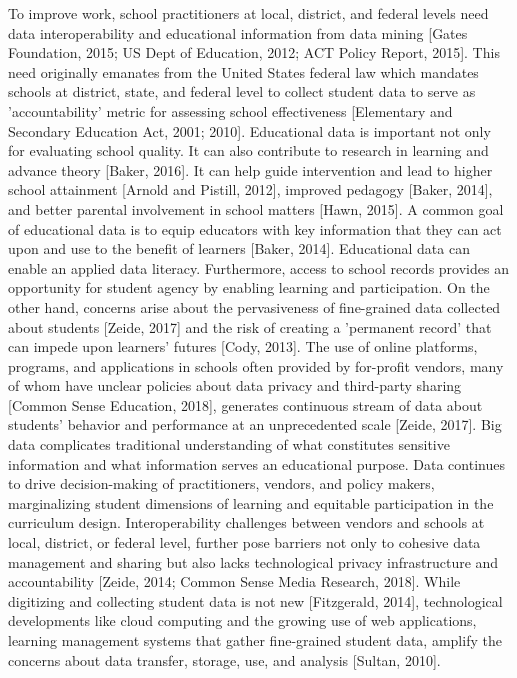 \documentclass{article}
\begin{document}
To improve work, school practitioners at local, district, and federal levels need data interoperability and educational information from data mining [Gates Foundation, 2015; US Dept of Education, 2012; ACT Policy Report, 2015]. This need originally emanates from the United States federal law which mandates schools at district, state, and federal level to collect student data to serve as 'accountability' metric for assessing school effectiveness [Elementary and Secondary Education Act, 2001; 2010].
\bigbreak
Educational data is important not only for evaluating school quality. It can also contribute to research in learning and advance theory [Baker, 2016]. It can help guide intervention and lead to higher school attainment [Arnold and Pistill, 2012], improved pedagogy [Baker, 2014], and better parental involvement in school matters [Hawn, 2015]. A common goal of educational data is to equip educators with key information that they can act upon and use to the benefit of learners [Baker, 2014]. Educational data can enable an applied data literacy. Furthermore, access to school records provides an opportunity for student agency by enabling learning and participation.
\bigbreak
On the other hand, concerns arise about the pervasiveness of fine-grained data collected about students [Zeide, 2017] and the risk of creating a 'permanent record' that can impede upon learners' futures [Cody, 2013]. The use of online platforms, programs, and applications in schools often provided by for-profit vendors, many of whom have unclear policies about data privacy and third-party sharing [Common Sense Education, 2018], generates continuous stream of data about students' behavior and performance at an unprecedented scale [Zeide, 2017]. Big data complicates traditional understanding of what constitutes sensitive information and what information serves an educational purpose. Data continues to drive decision-making of practitioners, vendors, and policy makers, marginalizing student dimensions of learning and equitable participation in the curriculum design.
\bigbreak
Interoperability challenges between vendors and schools at local, district, or federal level, further pose barriers not only to cohesive data management and sharing but also lacks technological privacy infrastructure and accountability [Zeide, 2014; Common Sense Media Research, 2018]. While digitizing and collecting student data is not new [Fitzgerald, 2014], technological developments like cloud computing and the growing use of web applications, learning management systems that gather fine-grained student data, amplify the concerns about data transfer, storage, use, and analysis [Sultan, 2010].
\end{document}
